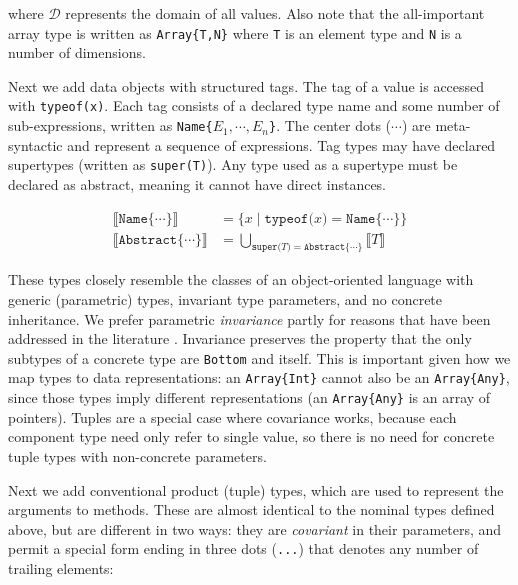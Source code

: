 \noindent
where $\mathcal{D}$ represents the domain of all values.
Also note that the all-important array type is written as \texttt{Array\{T,N\}} where
\texttt{T} is an element type and \texttt{N} is a number of dimensions.

Next we add data objects with structured tags.
The tag of a value is accessed with \texttt{typeof(x)}.
Each tag consists of a declared type name and some number of sub-expressions,
written as \texttt{Name\{}$E_1, \cdots, E_n$\texttt{\}}.
The center dots ($\cdots$) are meta-syntactic and represent a sequence of expressions.
Tag types may have declared supertypes (written as \texttt{super(T)}).
Any type used as a supertype must be declared as abstract, meaning it
cannot have direct instances.

\vspace{-3ex}
\begin{align*}
  \llbracket \texttt{Name\{}\cdots\texttt{\}} \rrbracket &= \{ x\mid \texttt{typeof(}x\texttt{)} = \texttt{Name\{}\cdots\texttt{\}} \} \\
  \llbracket \texttt{Abstract\{}\cdots\texttt{\}} \rrbracket &= \bigcup_{\texttt{super(}T\texttt{)} = \texttt{Abstract\{}\cdots\texttt{\}}} \llbracket T \rrbracket
\end{align*}

These types closely resemble the classes of an object-oriented language with
generic (parametric) types, invariant type parameters, and no concrete inheritance.
We prefer parametric \emph{invariance} partly for reasons that have been addressed in the
literature \cite{Day:1995:SVC:217838.217852}.
Invariance preserves the property that the only subtypes of a concrete type are \texttt{Bottom}
and itself.
This is important given how we map types to data representations: an \texttt{Array\{Int\}}
cannot also be an \texttt{Array\{Any\}}, since those types imply different
representations (an \texttt{Array\{Any\}} is an array of pointers).
Tuples are a special case where covariance works, because each component type need
only refer to single value, so there is no need for concrete
tuple types with non-concrete parameters.

Next we add conventional product (tuple) types, which are used to represent the
arguments to methods. These are almost identical to the nominal types defined above,
but are different in two ways: they are \emph{covariant} in their parameters, and permit
a special form ending in three dots (\texttt{...}) that denotes any number of trailing
elements:

